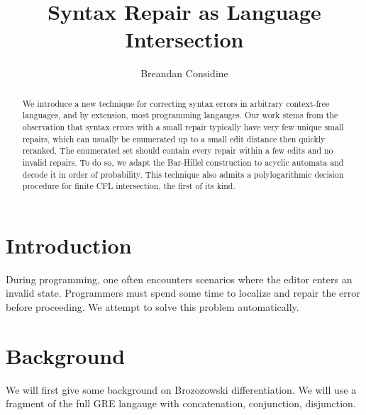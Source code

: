 \documentclass[sigplan,review,acmsmall,nonacm,screen,anonymous]{acmart}\settopmatter{printfolios=false,printccs=false,printacmref=false}
\begin{document}
%
  \title{Syntax Repair as Language Intersection}
  \begin{abstract}
    We introduce a new technique for correcting syntax errors in arbitrary context-free languages, and by extension, most programming langauges. Our work stems from the observation that syntax errors with a small repair typically have very few unique small repairs, which can usually be enumerated up to a small edit distance then quickly reranked. The enumerated set should contain every repair within a few edits and no invalid repairs. To do so, we adapt the Bar-Hillel construction to acyclic automata and decode it in order of probability. This technique also admits a polylogarithmic decision procedure for finite CFL intersection, the first of its kind.
  \end{abstract}

  \author{Breandan Considine}

  \maketitle

  \section{Introduction}

  During programming, one often encounters scenarios where the editor enters an invalid state. Programmers must spend some time to localize and repair the error before proceeding. We attempt to solve this problem automatically.

  \section{Background}

  We will first give some background on Brozozowski differentiation. We will use a fragment of the full GRE langauge with concatenation, conjunction, disjunction.
\end{document}

